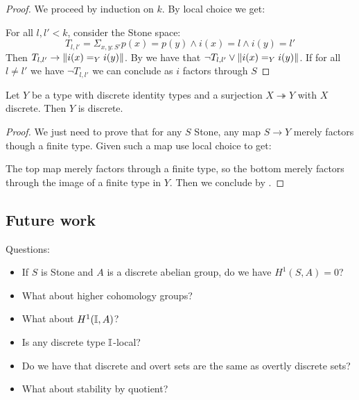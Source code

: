 \begin{proof}
We proceed by induction on $k$. By local choice we get:
 \begin{center}
\end{center}
For all $l,l'<k$, consider the Stone space:
\[T_{l,l'} = \Sigma_{x,y:S'}p(x)=p(y)\land i(x) = l \land i(y) = l'\] 
Then $T_{l,l'}\to \lVert i(x)=_Yi(y) \rVert$. By  we have that $\neg T_{l,l'} \lor \lVert i(x)=_Yi(y) \rVert$. If for all $l\not=l'$ we have $\neg T_{l,l'}$ we can conclude as $i$ factors through $S$ 
\end{proof}

\begin{proposition}
Let $Y$ be a type with discrete identity types and a surjection $X\twoheadrightarrow Y$ with $X$ discrete. Then $Y$ is discrete. 
\end{proposition}

\begin{proof}
We just need to prove that for any $S$ Stone, any map $S\to Y$ merely factors though a finite type. Given such a map use local choice to get:
 \begin{center}
\end{center}
The top map merely factors through a finite type, so the bottom merely factors through the image of a finite type in $Y$. Then we conclude by .
\end{proof}


\subsection{Future work}

Questions:
\begin{itemize}
\item If $S$ is Stone and $A$ is a discrete abelian group, do we have $H^1(S,A) = 0$? 
\item What about higher cohomology groups? 
\item What about $H^1(\mathbb{I},A)$? 
\item Is any discrete type $\mathbb{I}$-local? 
\item Do we have that discrete and overt sets are the same as overtly discrete sets?
\item What about stability by quotient?
\end{itemize}